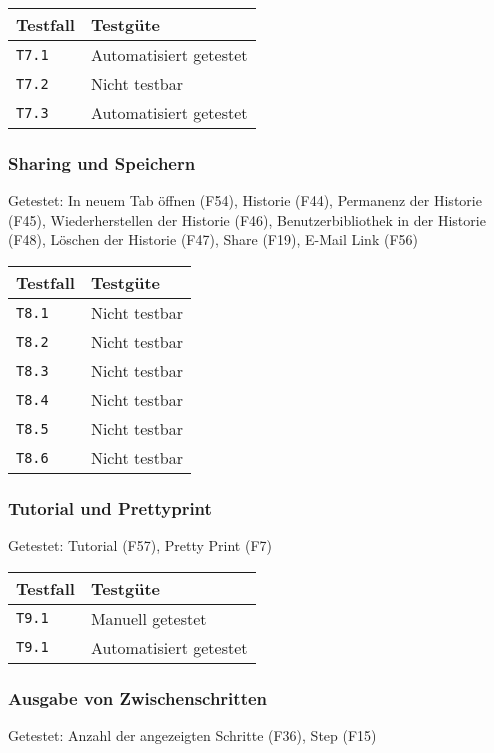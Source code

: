 \documentclass[parskip=full,11pt,twoside]{scrartcl}
\newcommand{\testline}[2]{
    \texttt{#1} & 
    \ifthenelse{\equal{#2}{Nicht getestet}}
        {\cellcolor{red!20}}
        {}
    \ifthenelse{\equal{#2}{Manuell getestet}}
        {\cellcolor{LimeGreen!20}}
        {}
    \ifthenelse{\equal{#2}{Automatisiert getestet}}
        {\cellcolor{green!20}}
        {}
    \ifthenelse{\equal{#2}{Nicht testbar}}
    {\cellcolor{gray!20}}
     {}
    #2 \\ \hline
}
\begin{document}
    \label{shortcuts}
    \begin{center}
        \begin{tabular}{ p{9cm} p{4cm}}
            Testfall & Testgüte \\ \hline
            \testline{T7.1}{Automatisiert getestet}
            \testline{T7.2}{Nicht testbar}
            \testline{T7.3}{Automatisiert getestet}
        \end{tabular}
    \end{center}

\subsubsection{Sharing und Speichern}
    Getestet:
    In neuem Tab öffnen (F54),
    Historie (F44),
    Permanenz der Historie (F45),
    Wiederherstellen der Historie (F46),
    Benutzerbibliothek in der Historie (F48),
    Löschen der Historie (F47),
    Share (F19),
    E-Mail Link (F56)

    \label{shortcuts}
    \begin{center}
        \begin{tabular}{ p{9cm} p{4cm}}
            Testfall & Testgüte \\ \hline
            \testline{T8.1}{Nicht testbar}
            \testline{T8.2}{Nicht testbar}
            \testline{T8.3}{Nicht testbar}
            \testline{T8.4}{Nicht testbar}
            \testline{T8.5}{Nicht testbar}
            \testline{T8.6}{Nicht testbar}
        \end{tabular}
    \end{center}

\subsubsection{Tutorial und Prettyprint}
    Getestet:
    Tutorial (F57),
    Pretty Print (F7)

    \label{shortcuts}
    \begin{center}
        \begin{tabular}{ p{9cm} p{4cm}}
            Testfall & Testgüte \\ \hline
            \testline{T9.1}{Manuell getestet}
            \testline{T9.1}{Automatisiert getestet}
        \end{tabular}
    \end{center}

\subsubsection{Ausgabe von Zwischenschritten}
    Getestet:
    Anzahl der angezeigten Schritte (F36),
    Step (F15)
\end{document}

